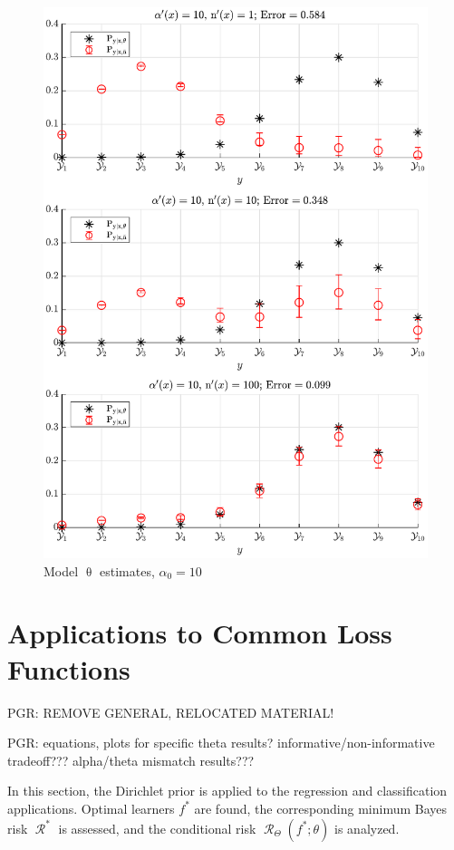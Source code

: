 \documentclass[12pt]{report}
\DeclareMathOperator{\Rcal}{\mathcal{R}}
\begin{document}
\begin{figure}
\centering
\includegraphics[width=0.7\linewidth]{P_yx_error_a0_10.pdf}
\caption{Model $\uptheta$ estimates, $\alpha_0 = 10$}
\label{fig:P_yx_error_a0_10}
\end{figure}























\newpage



\section{Applications to Common Loss Functions}

PGR: REMOVE GENERAL, RELOCATED MATERIAL!

PGR: equations, plots for specific theta results? informative/non-informative tradeoff??? alpha/theta mismatch results???

In this section, the Dirichlet prior is applied to the regression and classification applications. Optimal learners $f^*$ are found,  the corresponding minimum Bayes risk $\Rcal^*$ is assessed, and the conditional risk $\Rcal_{\Theta}(f^*;\theta)$ is analyzed.
\end{document}
